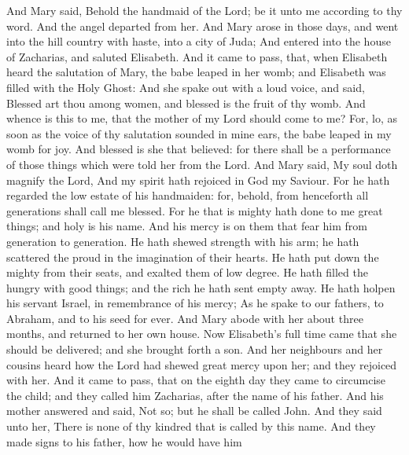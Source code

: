  And Mary said, Behold the handmaid of the Lord; be it
unto me according to thy word. And the angel departed from her.
 And Mary arose in those days, and went into the hill
country with haste, into a city of Juda;  And entered
into the house of Zacharias, and saluted Elisabeth.  And
it came to pass, that, when Elisabeth heard the salutation of Mary, the
babe leaped in her womb; and Elisabeth was filled with the Holy Ghost:
 And she spake out with a loud voice, and said, Blessed
art thou among women, and blessed is the fruit of thy womb.
 And whence is this to me, that the mother of my Lord
should come to me?  For, lo, as soon as the voice of thy
salutation sounded in mine ears, the babe leaped in my womb for joy.
 And blessed is she that believed: for there shall be a
performance of those things which were told her from the Lord.
 And Mary said, My soul doth magnify the Lord,
 And my spirit hath rejoiced in God my Saviour.
 For he hath regarded the low estate of his handmaiden:
for, behold, from henceforth all generations shall call me blessed.
 For he that is mighty hath done to me great things; and
holy is his name.  And his mercy is on them that fear him
from generation to generation.  He hath shewed strength
with his arm; he hath scattered the proud in the imagination of their
hearts.  He hath put down the mighty from their seats,
and exalted them of low degree.  He hath filled the
hungry with good things; and the rich he hath sent empty away.
 He hath holpen his servant Israel, in remembrance of his
mercy;  As he spake to our fathers, to Abraham, and to
his seed for ever.  And Mary abode with her about three
months, and returned to her own house.  Now Elisabeth's
full time came that she should be delivered; and she brought forth a
son.  And her neighbours and her cousins heard how the
Lord had shewed great mercy upon her; and they rejoiced with her.
 And it came to pass, that on the eighth day they came to
circumcise the child; and they called him Zacharias, after the name of
his father.  And his mother answered and said, Not so;
but he shall be called John.  And they said unto her,
There is none of thy kindred that is called by this name.
 And they made signs to his father, how he would have him
